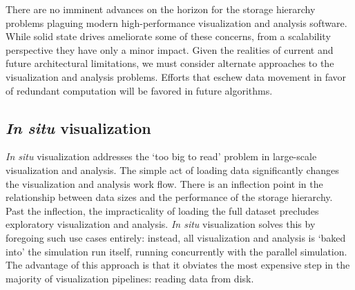 

There are no imminent advances on the horizon for the storage hierarchy
problems plaguing modern high-performance visualization and analysis
software.  While solid state drives ameliorate some of these concerns,
from a scalability perspective they have only a minor impact.  Given
the realities of current and future architectural limitations, we
must consider alternate approaches to the visualization and analysis
problems.  Efforts that eschew data movement in favor of redundant
computation will be favored in future algorithms.


\subsection{\textit{In situ} visualization}

\textit{In situ} visualization addresses the `too big to read' problem
in large-scale visualization and analysis.  The simple act of loading
data significantly changes the visualization and analysis work flow.
There is an inflection point in the relationship between data sizes and
the performance of the storage hierarchy.  Past the inflection, the
impracticality of loading the full
dataset precludes exploratory visualization and analysis. \textit{In
situ} visualization solves this by foregoing such use cases entirely:
instead, all visualization and analysis is `baked into' the simulation
run itself, running concurrently with the parallel simulation.  The
advantage of this approach is that it obviates the most expensive step
in the majority of visualization pipelines: reading data from disk.


